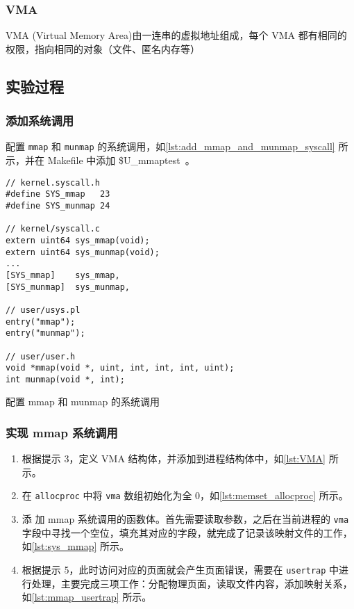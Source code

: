 \subsubsection{VMA}

VMA (Virtual Memory Area)由一连串的虚拟地址组成，每个 VMA 都有相同的权限，指向相同的对象（文件、匿名内存等）

\subsection{实验过程}

\subsubsection{添加系统调用}

配置 \texttt{mmap} 和 \texttt{munmap} 的系统调用，如\cref{lst:add_mmap_and_munmap_syscall} 所示，并在 Makefile 中添加 \$U\_mmaptest\ 。

\begin{listing}[!htb]
	\begin{verbatim}
// kernel.syscall.h
#define SYS_mmap   23
#define SYS_munmap 24

// kernel/syscall.c
extern uint64 sys_mmap(void);
extern uint64 sys_munmap(void);
...
[SYS_mmap]    sys_mmap,
[SYS_munmap]  sys_munmap,

// user/usys.pl
entry("mmap");
entry("munmap");

// user/user.h
void *mmap(void *, uint, int, int, int, uint);
int munmap(void *, int);
	\end{verbatim}
	\caption{配置 mmap 和 munmap 的系统调用}\label{lst:add_mmap_and_munmap_syscall}
\end{listing}

\subsubsection{实现 mmap 系统调用}

\begin{enumerate}
	\item 根据提示 3，定义 VMA 结构体，并添加到进程结构体中，如\cref{lst:VMA} 所示。
	\item 在 \texttt{allocproc} 中将 \texttt{vma} 数组初始化为全 0，如\cref{lst:memset_allocproc} 所示。
	\item 添                                                                                       加 mmap 系统调用的函数体。首先需要读取参数，之后在当前进程的 \texttt{vma} 
	字段中寻找一个空位，填充其对应的字段，就完成了记录该映射文件的工作，如\cref{lst:sys_mmap} 所示。
	\item 根据提示 5，此时访问对应的页面就会产生页面错误，需要在 \texttt{usertrap} 中进行处理，主要完成三项工作：分配物理页面，读取文件内容，添加映射关系，如\cref{lst:mmap_usertrap} 所示。
\end{enumerate}

